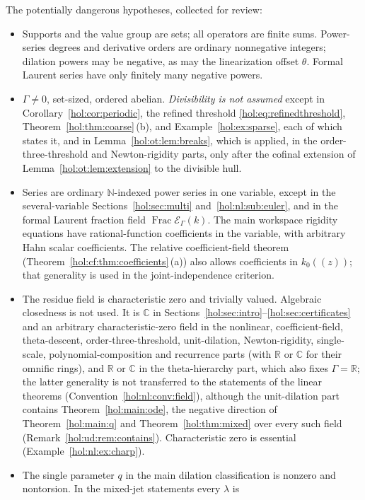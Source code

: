 \documentclass[11pt]{article}
\numberwithin{equation}{section}
\theoremstyle{definition}
\theoremstyle{remark}
\newcommand{\C}{\mathbb C}
\newcommand{\R}{\mathbb R}
\newcommand{\N}{\mathbb N}
\newcommand{\EK}{\mathcal E_\Gamma(k)}
\newcommand{\FE}{\operatorname{Frac}\EK}
\begin{document}
The potentially dangerous hypotheses, collected for review:
\begin{itemize}
\item Supports and the value group are sets; all operators are finite sums.
Power-series degrees and derivative orders are ordinary nonnegative integers;
dilation powers may be negative, as may the linearization offset $\theta$.
Formal Laurent series have only finitely many negative powers.
\item $\Gamma\ne0$, set-sized, ordered abelian. \emph{Divisibility is not
assumed} except in Corollary~\ref{hol:cor:periodic}, the refined threshold
\eqref{hol:eq:refinedthreshold}, Theorem~\ref{hol:thm:coarse}\,(b),
and Example~\ref{hol:ex:sparse}, each of which states it, and in
Lemma~\ref{hol:ot:lem:breaks}, which is applied, in the order-three-threshold
and Newton-rigidity parts, only after the cofinal extension of
Lemma~\ref{hol:ot:lem:extension} to the divisible hull.
\item Series are ordinary $\N$-indexed power series in one variable, except
in the several-variable Sections~\ref{hol:sec:multi}
and~\ref{hol:nl:sub:euler}, and in the formal Laurent fraction field
$\FE$. The main workspace rigidity equations have rational-function
coefficients in the variable, with arbitrary Hahn scalar coefficients.
The relative coefficient-field theorem
(Theorem~\ref{hol:cf:thm:coefficients}\,(a)) also allows coefficients in
$k_0((z))$; that generality is used in the joint-independence criterion.
\item The residue field is characteristic zero and trivially valued.
Algebraic closedness is not used. It is $\C$ in
Sections~\ref{hol:sec:intro}--\ref{hol:sec:certificates} and an arbitrary
characteristic-zero field in the nonlinear, coefficient-field, theta-descent,
order-three-threshold, unit-dilation, Newton-rigidity, single-scale,
polynomial-composition and recurrence parts (with $\R$ or $\C$ for their
omnific rings), and
$\R$ or $\C$ in the
theta-hierarchy part, which also fixes $\Gamma=\R$; the latter
generality is not transferred to the statements of the linear theorems
(Convention~\ref{hol:nl:conv:field}), although the unit-dilation part contains
Theorem~\ref{hol:main:ode}, the negative direction of
Theorem~\ref{hol:main:q} and Theorem~\ref{hol:thm:mixed} over every such field
(Remark~\ref{hol:ud:rem:contains}).
Characteristic zero is essential (Example~\ref{hol:nl:ex:charp}).
\item The single parameter $q$ in the main dilation classification is
nonzero and nontorsion. In the mixed-jet statements every $\lambda$ is

\end{itemize}
\end{document}
